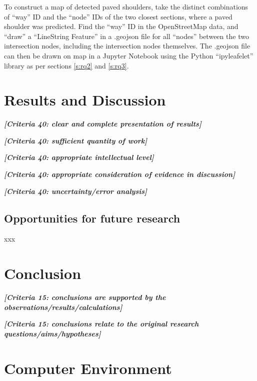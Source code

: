 \documentclass[11pt,twoside]{report}
\newcommand{\remark}[1]{{\bf \em [\marginpar{$\Leftarrow$}#1]}}
\begin{document}
To construct a map of detected paved shoulders, take the distinct combinations of ``way'' ID and the ``node'' IDs of the two closest sections, where a paved shoulder was predicted.  Find the ``way'' ID in the OpenStreetMap data, and ``draw'' a ``LineString Feature'' in a .geojson file for all ``nodes'' between the two intersection nodes, including the intersection nodes themselves.  The .geojson file can then be drawn on map in a Jupyter Notebook using the Python ``ipyleafelet'' library as per sections \ref{s:rq2} and \ref{s:rq3}.


\chapter{Results and Discussion}
\label{s:results}

\remark{Criteria 40: clear and complete presentation of results}

\remark{Criteria 40: sufficient quantity of work}

\remark{Criteria 40: appropriate intellectual level}

\remark{Criteria 40: appropriate consideration of evidence in discussion}

\remark{Criteria 40: uncertainty/error analysis}

\section{Opportunities for future research}
\label{s:future_work}

xxx


\chapter{Conclusion}

\remark{Criteria 15: conclusions are supported by the observations/results/calculations}

\remark{Criteria 15: conclusions relate to the original research questions/aims/hypotheses}

\appendix
\chapter{Computer Environment}
\label{a:environment}
\end{document}
